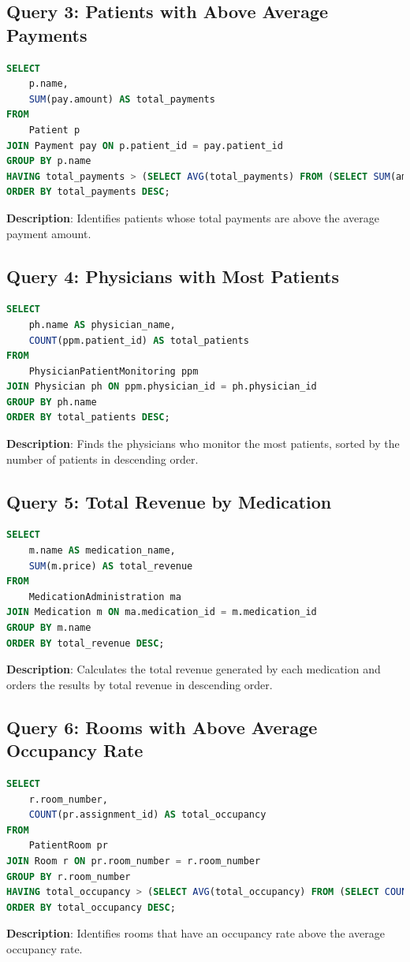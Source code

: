 \documentclass{article}
\begin{document}
\subsection{Query 3: Patients with Above Average Payments}
\begin{lstlisting}[language=SQL]
SELECT 
    p.name,
    SUM(pay.amount) AS total_payments
FROM 
    Patient p
JOIN Payment pay ON p.patient_id = pay.patient_id
GROUP BY p.name
HAVING total_payments > (SELECT AVG(total_payments) FROM (SELECT SUM(amount) AS total_payments FROM Payment GROUP BY patient_id) AS subquery)
ORDER BY total_payments DESC;
\end{lstlisting}
\textbf{Description}: Identifies patients whose total payments are above the average payment amount.

\subsection{Query 4: Physicians with Most Patients}
\begin{lstlisting}[language=SQL]
SELECT 
    ph.name AS physician_name,
    COUNT(ppm.patient_id) AS total_patients
FROM 
    PhysicianPatientMonitoring ppm
JOIN Physician ph ON ppm.physician_id = ph.physician_id
GROUP BY ph.name
ORDER BY total_patients DESC;
\end{lstlisting}
\textbf{Description}: Finds the physicians who monitor the most patients, sorted by the number of patients in descending order.

\subsection{Query 5: Total Revenue by Medication}
\begin{lstlisting}[language=SQL]
SELECT 
    m.name AS medication_name,
    SUM(m.price) AS total_revenue
FROM 
    MedicationAdministration ma
JOIN Medication m ON ma.medication_id = m.medication_id
GROUP BY m.name
ORDER BY total_revenue DESC;
\end{lstlisting}
\textbf{Description}: Calculates the total revenue generated by each medication and orders the results by total revenue in descending order.

\subsection{Query 6: Rooms with Above Average Occupancy Rate}
\begin{lstlisting}[language=SQL]
SELECT 
    r.room_number,
    COUNT(pr.assignment_id) AS total_occupancy
FROM 
    PatientRoom pr
JOIN Room r ON pr.room_number = r.room_number
GROUP BY r.room_number
HAVING total_occupancy > (SELECT AVG(total_occupancy) FROM (SELECT COUNT(assignment_id) AS total_occupancy FROM PatientRoom GROUP BY room_number) AS subquery)
ORDER BY total_occupancy DESC;
\end{lstlisting}
\textbf{Description}: Identifies rooms that have an occupancy rate above the average occupancy rate.
\end{document}
